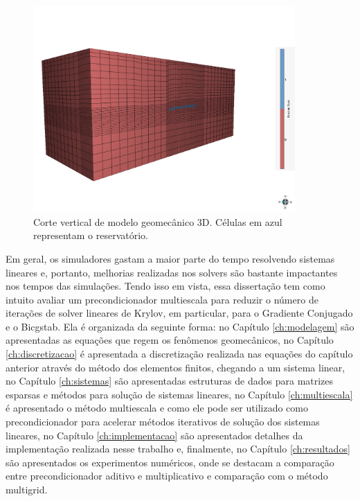 \begin{figure}[!htbp]
\centering
\includegraphics[width=10cm]{chap00/figs/Geresim(0054).png}
\caption{Corte vertical de modelo geomecânico 3D. Células em azul representam o reservatório.}
\label{fig:modelogeomec3d}
\end{figure}

Em geral, os simuladores gastam a maior parte do tempo resolvendo sistemas lineares e, portanto, melhorias realizadas nos solvers são bastante impactantes nos tempos das simulações. Tendo isso em vista, essa dissertação tem como intuito avaliar um precondicionador multiescala para reduzir o número de iterações de solver lineares de Krylov, em particular, para o Gradiente Conjugado e o Bicgstab. Ela é organizada da seguinte forma: no Capítulo \ref{ch:modelagem} são apresentadas as equações que regem os fenômenos geomecânicos, no Capítulo \ref{ch:discretizacao} é apresentada a discretização realizada nas equações do capítulo anterior através do método dos elementos finitos, chegando a um sistema linear, no Capítulo \ref{ch:sistemas} são apresentadas estruturas de dados para matrizes esparsas e métodos para solução de sistemas lineares, no Capítulo \ref{ch:multiescala} é apresentado o método multiescala e como ele pode ser utilizado como precondicionador para acelerar métodos iterativos de solução dos sistemas lineares, no Capítulo \ref{ch:implementacao} são apresentados detalhes da implementação realizada nesse trabalho e, finalmente, no Capítulo \ref{ch:resultados} são apresentados os experimentos numéricos, onde se destacam a comparação entre precondicionador aditivo e multiplicativo e comparação com o método multigrid. 




